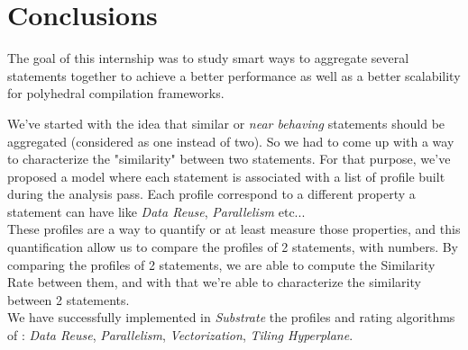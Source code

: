 \documentclass[paper=a4, fontsize=11.5pt]{scrartcl}
\numberwithin{equation}{section}        %
\numberwithin{figure}{section}          %
\numberwithin{table}{section}               %
\begin{document}

    
\section{Conclusions}
The goal of this internship was to study smart ways to aggregate several statements
together to achieve a better performance as well as a better scalability for polyhedral
compilation frameworks.

\bigskip

We've started with the idea that similar or \textit{near behaving} statements should be
aggregated (considered as one instead of two). So we had to come up with a way to characterize
the "similarity" between two statements. For that purpose, we've proposed a model where
each statement is associated with a list of profile built during the analysis pass.
Each profile correspond to a different property a statement can have like \textit{Data Reuse},
\textit{Parallelism} etc...\\
These profiles are a way to quantify or at least measure those properties, and this quantification
allow us to compare the profiles of 2 statements, with numbers. By comparing the profiles
of 2 statements, we are able to compute the Similarity Rate between them, and with that we're
able to characterize the similarity between 2 statements.\\
We have successfully implemented in \textit{Substrate} the profiles and rating algorithms of :
\textit{Data Reuse}, \textit{Parallelism}, \textit{Vectorization}, \textit{Tiling Hyperplane}.
\end{document}
